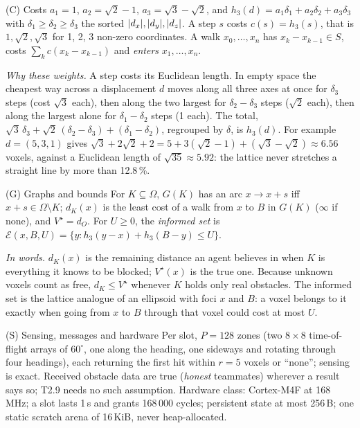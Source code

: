 \documentclass[11pt,a4paper]{article}
\newcommand{\Vs}{V^\star}
\newcommand{\E}{\mathcal E}
\DeclarePairedDelimiter\abs{\lvert}{\rvert}
\begin{document}
\begin{defn}{(C) Costs}
$a_1=1$, $a_2=\sqrt2-1$, $a_3=\sqrt3-\sqrt2$, and $h_3(d)=a_1\delta_1+a_2\delta_2+a_3\delta_3$ with
$\delta_1\ge\delta_2\ge\delta_3$ the sorted $\abs{d_x},\abs{d_y},\abs{d_z}$. A step $s$ costs $c(s)=h_3(s)$, that is
$1,\sqrt2,\sqrt3$ for 1, 2, 3 non-zero coordinates. A walk $x_0,\dots,x_n$ has $x_k-x_{k-1}\in S$, costs
$\sum_kc(x_k-x_{k-1})$ and \emph{enters} $x_1,\dots,x_n$.
\end{defn}

\noindent\emph{Why these weights.} A step costs its Euclidean length. In empty space the cheapest way across a
displacement $d$ moves along all three axes at once for $\delta_3$ steps (cost $\sqrt3$ each), then along the two
largest for $\delta_2-\delta_3$ steps ($\sqrt2$ each), then along the largest alone for $\delta_1-\delta_2$ steps (1
each). The total, $\sqrt3\,\delta_3+\sqrt2\,(\delta_2-\delta_3)+(\delta_1-\delta_2)$, regrouped by $\delta$, is $h_3(d)$.
For example $d=(5,3,1)$ gives $\sqrt3+2\sqrt2+2=5+3(\sqrt2-1)+(\sqrt3-\sqrt2)\approx6.56$ voxels, against a Euclidean
length of $\sqrt{35}\approx5.92$: the lattice never stretches a straight line by more than 12.8\,\%.

\begin{defn}{(G) Graphs and bounds}
For $K\subseteq\Omega$, $G(K)$ has an arc $x\to x+s$ iff $x+s\in\Omega\setminus K$; $d_K(x)$ is the least cost of a walk
from $x$ to $B$ in $G(K)$ ($\infty$ if none), and $\Vs=d_O$. For $U\ge0$, the \emph{informed set} is
$\E(x,B,U)=\{y:h_3(y-x)+h_3(B-y)\le U\}$.
\end{defn}

\noindent\emph{In words.} $d_K(x)$ is the remaining distance an agent believes in when $K$ is everything it knows to be
blocked; $\Vs(x)$ is the true one. Because unknown voxels count as free, $d_K\le\Vs$ whenever $K$ holds only real
obstacles. The informed set is the lattice analogue of an ellipsoid with foci $x$ and $B$: a voxel belongs to it
exactly when going from $x$ to $B$ through that voxel could cost at most $U$.

\begin{defn}{(S) Sensing, messages and hardware}
Per slot, $P=128$ zones (two $8\times8$ time-of-flight arrays of $60^\circ$, one along the heading, one sideways and
rotating through four headings), each returning the first hit within $r=5$ voxels or ``none''; sensing is exact.
Received obstacle data are true (\emph{honest} teammates) wherever a result says so; T2.9 needs no such assumption.
Hardware class: Cortex-M4F at 168\,MHz; a slot lasts 1\,s and grants 168\,000 cycles; persistent state at most 256\,B;
one static scratch arena of 16\,KiB, never heap-allocated.
\end{defn}
\end{document}
